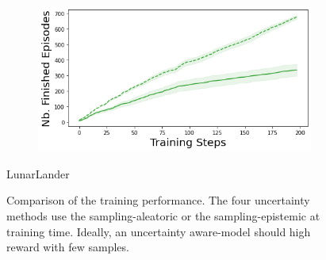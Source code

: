 \begin{figure}
\begin{subfigure}{.24\textwidth}
    \end{subfigure}
    \begin{subfigure}{.24\textwidth}
        \includegraphics[width=\textwidth]{sections/011_icml2022/resources/lunarlander-n_finished_training_episodes-postnet-training-strategy.png}
    \end{subfigure}
    \vspace{-3mm}
    \caption*{LunarLander}
    \vspace{2mm}
    
    \caption{Comparison of the training performance. The four uncertainty methods use the sampling-aleatoric or the sampling-epistemic at training time. Ideally, an uncertainty aware-model should high reward with few samples.}
    \label{fig:strategy-training-performance}
\end{figure}